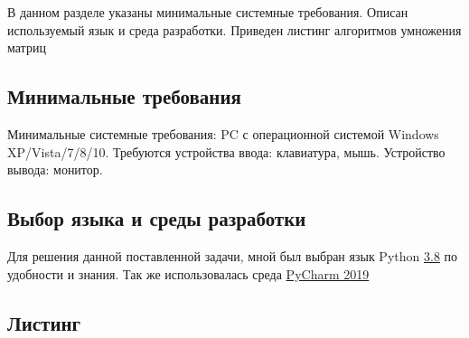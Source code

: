 \documentclass[../main.tex]{subfiles}
\begin{document}
	
	В данном разделе указаны минимальные системные требования. Описан используемый язык и среда разработки.
	Приведен листинг алгоритмов умножения матриц

\subsection{Минимальные требования}

	Минимальные системные требования: PC с операционной системой Windows XP/Vista/7/8/10. Требуются устройства ввода: клавиатура, мышь. Устройство вывода: монитор.

\subsection{Выбор языка и среды разработки}

	Для решения данной поставленной задачи, мной был выбран язык Python \href{https://docs.python.org/3/whatsnew/3.8.html}{3.8} по удобности и знания. Так же использовалась среда \href{https://www.jetbrains.com/pycharm/}{PyCharm 2019}
	
\subsection{Листинг}

	
	
	
					
	
					
	
\end{document}
